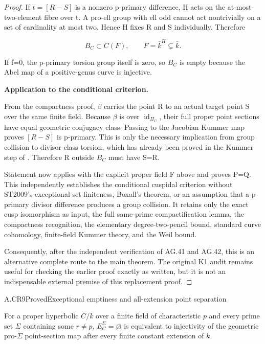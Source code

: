 \begin{proof}
If \(t=[R-S]\) is a nonzero p-primary difference, H acts on the at-most-two-element fibre over t. A pro-ell group with ell odd cannot act nontrivially on a set of cardinality at most two. Hence H fixes R and S individually. Therefore

\[B_C\subset C(F),\qquad F=\bar k^H\subsetneq\bar k.\]

If f=0, the p-primary torsion group itself is zero, so \(B_C\) is empty because the Abel map of a positive-genus curve is injective.

\textbf{Application to the conditional criterion.}

From the compactness proof, \({\beta}\) carries the point R to an actual target point S over the same finite field. Because \({\beta}\) is over \(\operatorname{id}_{{\Pi}_C}\), their full proper point sections have equal geometric conjugacy class. Passing to the Jacobian Kummer map proves \([R-S]\) is p-primary. This is only the necessary implication from group collision to divisor-class torsion, which has already been proved in the Kummer step of . Therefore R outside \(B_C\) must have S=R.

Statement  now applies with the explicit proper field F above and proves P=Q. This independently establishes the conditional cuspidal criterion without ST2009's exceptional-set finiteness, Boxall's theorem, or an assumption that a p-primary divisor difference produces a group collision. It retains only the exact cusp isomorphism as input, the full same-prime compactification lemma, the compactness recognition, the elementary degree-two-pencil bound, standard curve cohomology, finite-field Kummer theory, and the Weil bound.

Consequently, after the independent verification of AG.41 and AG.42, this is an alternative complete route to the main theorem. The original K1 audit remains useful for checking the earlier proof exactly as written, but it is not an indispensable external premise of this replacement proof.


\end{proof}

\begin{claim}{A.CR9}{Proved}{Exceptional emptiness and all-extension point separation}

For a proper hyperbolic $C/k$ over a finite field of characteristic
$p$ and every prime set $\Sigma$ containing some $r\ne p$,
$E_C^\Sigma=\varnothing$ is equivalent to injectivity of the
geometric pro-$\Sigma$ point-section map after every finite
constant extension of $k$.

\end{claim}

